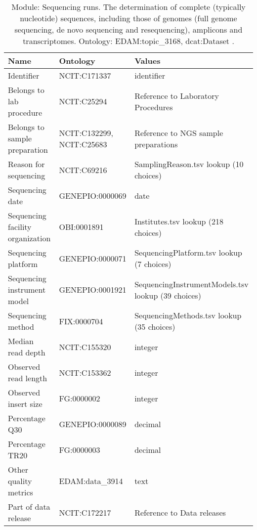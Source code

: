 \documentclass{article}
\begin{document}
\begin{table}[htb]
\begin{tabular}{lll}
Name & Ontology & Values \\
\hline
Identifier & NCIT:C171337  & identifier \\
Belongs to lab procedure & NCIT:C25294  & Reference to Laboratory Procedures \\
Belongs to sample preparation & NCIT:C132299, NCIT:C25683  & Reference to NGS sample preparations \\
Reason for sequencing & NCIT:C69216  & SamplingReason.tsv lookup (10 choices) \\
Sequencing date & GENEPIO:0000069  & date \\
Sequencing facility organization & OBI:0001891  & Institutes.tsv lookup (218 choices) \\
Sequencing platform & GENEPIO:0000071  & SequencingPlatform.tsv lookup (7 choices) \\
Sequencing instrument model & GENEPIO:0001921  & SequencingInstrumentModels.tsv lookup (39 choices) \\
Sequencing method & FIX:0000704  & SequencingMethods.tsv lookup (35 choices) \\
Median read depth & NCIT:C155320  & integer \\
Observed read length & NCIT:C153362  & integer \\
Observed insert size & FG:0000002  & integer \\
Percentage Q30 & GENEPIO:0000089  & decimal \\
Percentage TR20 & FG:0000003  & decimal \\
Other quality metrics & EDAM:data\_3914  & text \\
Part of data release & NCIT:C172217  & Reference to Data releases \\
\hline
\end{tabular}
\caption[Module: Sequencing runs]{\label{table:table11} Module: Sequencing runs. The determination of complete (typically nucleotide) sequences, including those of genomes (full genome sequencing, de novo sequencing and resequencing), amplicons and transcriptomes. Ontology: EDAM:topic\_3168, dcat:Dataset . }
\end{table}
\end{document}
